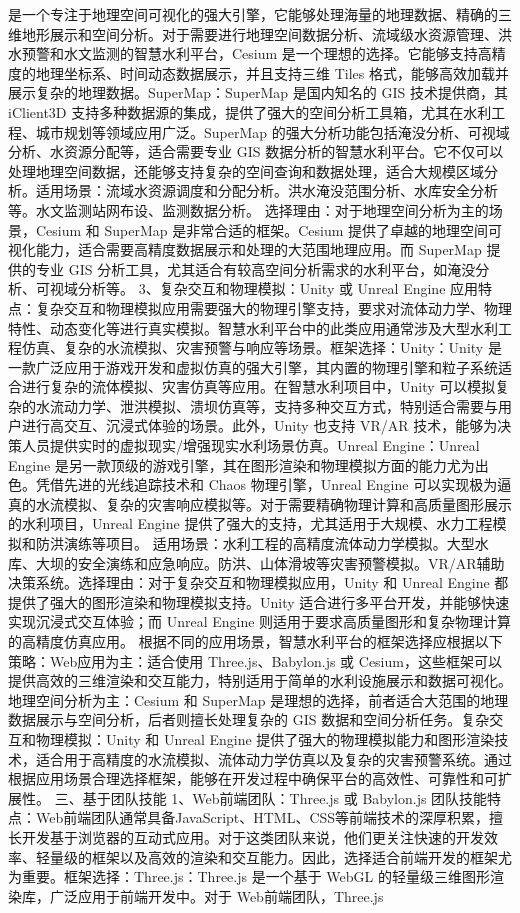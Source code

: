 是一个专注于地理空间可视化的强大引擎，它能够处理海量的地理数据、精确的三维地形展示和空间分析。对于需要进行地理空间数据分析、流域级水资源管理、洪水预警和水文监测的智慧水利平台，Cesium 是一个理想的选择。它能够支持高精度的地理坐标系、时间动态数据展示，并且支持三维 Tiles 格式，能够高效加载并展示复杂的地理数据。SuperMap：SuperMap 是国内知名的 GIS 技术提供商，其 iClient3D 支持多种数据源的集成，提供了强大的空间分析工具箱，尤其在水利工程、城市规划等领域应用广泛。SuperMap 的强大分析功能包括淹没分析、可视域分析、水资源分配等，适合需要专业 GIS 数据分析的智慧水利平台。它不仅可以处理地理空间数据，还能够支持复杂的空间查询和数据处理，适合大规模区域分析。适用场景：流域水资源调度和分配分析。洪水淹没范围分析、水库安全分析等。水文监测站网布设、监测数据分析。 选择理由：对于地理空间分析为主的场景，Cesium 和 SuperMap 是非常合适的框架。Cesium 提供了卓越的地理空间可视化能力，适合需要高精度数据展示和处理的大范围地理应用。而 SuperMap 提供的专业 GIS 分析工具，尤其适合有较高空间分析需求的水利平台，如淹没分析、可视域分析等。 3、复杂交互和物理模拟：Unity 或 Unreal Engine 应用特点：复杂交互和物理模拟应用需要强大的物理引擎支持，要求对流体动力学、物理特性、动态变化等进行真实模拟。智慧水利平台中的此类应用通常涉及大型水利工程仿真、复杂的水流模拟、灾害预警与响应等场景。框架选择：Unity：Unity 是一款广泛应用于游戏开发和虚拟仿真的强大引擎，其内置的物理引擎和粒子系统适合进行复杂的流体模拟、灾害仿真等应用。在智慧水利项目中，Unity 可以模拟复杂的水流动力学、泄洪模拟、溃坝仿真等，支持多种交互方式，特别适合需要与用户进行高交互、沉浸式体验的场景。此外，Unity 也支持 VR/AR 技术，能够为决策人员提供实时的虚拟现实/增强现实水利场景仿真。Unreal Engine：Unreal Engine 是另一款顶级的游戏引擎，其在图形渲染和物理模拟方面的能力尤为出色。凭借先进的光线追踪技术和 Chaos 物理引擎，Unreal Engine 可以实现极为逼真的水流模拟、复杂的灾害响应模拟等。对于需要精确物理计算和高质量图形展示的水利项目，Unreal Engine 提供了强大的支持，尤其适用于大规模、水力工程模拟和防洪演练等项目。 适用场景：水利工程的高精度流体动力学模拟。大型水库、大坝的安全演练和应急响应。防洪、山体滑坡等灾害预警模拟。VR/AR辅助决策系统。选择理由：对于复杂交互和物理模拟应用，Unity 和 Unreal Engine 都提供了强大的图形渲染和物理模拟支持。Unity 适合进行多平台开发，并能够快速实现沉浸式交互体验；而 Unreal Engine 则适用于要求高质量图形和复杂物理计算的高精度仿真应用。 根据不同的应用场景，智慧水利平台的框架选择应根据以下策略：Web应用为主：适合使用 Three.js、Babylon.js 或 Cesium，这些框架可以提供高效的三维渲染和交互能力，特别适用于简单的水利设施展示和数据可视化。地理空间分析为主：Cesium 和 SuperMap 是理想的选择，前者适合大范围的地理数据展示与空间分析，后者则擅长处理复杂的 GIS 数据和空间分析任务。复杂交互和物理模拟：Unity 和 Unreal Engine 提供了强大的物理模拟能力和图形渲染技术，适合用于高精度的水流模拟、流体动力学仿真以及复杂的灾害预警系统。通过根据应用场景合理选择框架，能够在开发过程中确保平台的高效性、可靠性和可扩展性。 三、基于团队技能 1、Web前端团队：Three.js 或 Babylon.js 团队技能特点：Web前端团队通常具备JavaScript、HTML、CSS等前端技术的深厚积累，擅长开发基于浏览器的互动式应用。对于这类团队来说，他们更关注快速的开发效率、轻量级的框架以及高效的渲染和交互能力。因此，选择适合前端开发的框架尤为重要。框架选择：Three.js：Three.js 是一个基于 WebGL 的轻量级三维图形渲染库，广泛应用于前端开发中。对于 Web前端团队，Three.js 